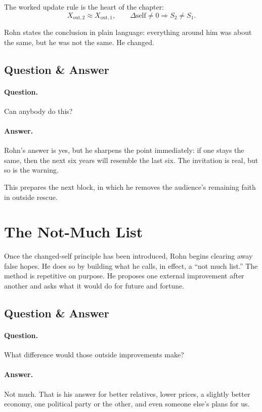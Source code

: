 The worked update rule is the heart of the chapter:
\begin{equation}
X_{\text{out},2} \approx X_{\text{out},1},
\qquad
\Delta \text{self} \neq 0
\Longrightarrow
S_2 \neq S_1.
\end{equation}

Rohn states the conclusion in plain language: everything around him was about the same, but he was not the same. He changed.

\subsection{Question \& Answer}

\paragraph{Question.} Can anybody do this?

\paragraph{Answer.} Rohn's answer is yes, but he sharpens the point immediately: if one stays the same, then the next six years will resemble the last six. The invitation is real, but so is the warning.

This prepares the next block, in which he removes the audience's remaining faith in outside rescue.

\section{The Not-Much List}

Once the changed-self principle has been introduced, Rohn begins clearing away false hopes. He does so by building what he calls, in effect, a ``not much list.'' The method is repetitive on purpose. He proposes one external improvement after another and asks what it would do for future and fortune.

\subsection{Question \& Answer}

\paragraph{Question.} What difference would those outside improvements make?

\paragraph{Answer.} Not much. That is his answer for better relatives, lower prices, a slightly better economy, one political party or the other, and even someone else's plans for us.

